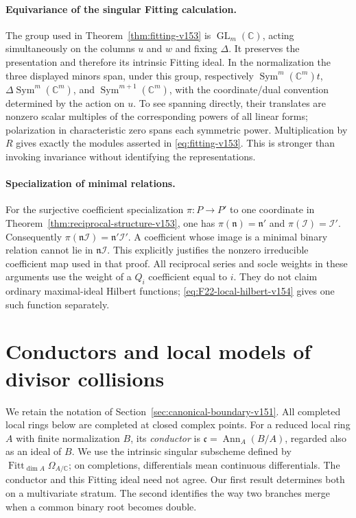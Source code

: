 \documentclass[11pt,reqno]{amsart}
\numberwithin{equation}{section}
\theoremstyle{definition}\newtheorem{definition}[theorem]{Definition}
\theoremstyle{remark}\newtheorem{remark}[theorem]{Remark}
\newcommand{\C}{\mathbb C}\newcommand{\Q}{\mathbb Q}
\DeclareMathOperator{\Sym}{Sym}\DeclareMathOperator{\Gr}{Gr}
\DeclareMathOperator{\Fitt}{Fitt}\DeclareMathOperator{\Ann}{Ann}
\begin{document}
\paragraph{Equivariance of the singular Fitting calculation.}
The group used in Theorem~\ref{thm:fitting-v153} is
$\operatorname{GL}_m(\C)$, acting simultaneously on the columns
$u$ and $w$ and fixing $\Delta$. It preserves the presentation and
therefore its intrinsic Fitting ideal. In the normalization the
three displayed minors span, under this group, respectively
$\Sym^m(\C^m)t$, $\Delta\Sym^m(\C^m)$, and
$\Sym^{m+1}(\C^m)$, with the coordinate/dual convention determined
by the action on $u$. To see spanning directly, their translates
are nonzero scalar multiples of the corresponding powers of all
linear forms; polarization in characteristic zero spans each
symmetric power. Multiplication by $R$ gives exactly the modules
asserted in \eqref{eq:fitting-v153}. This is stronger than invoking
invariance without identifying the representations.

\paragraph{Specialization of minimal relations.}
For the surjective coefficient specialization $\pi:P\to P'$ to
one coordinate in Theorem~\ref{thm:reciprocal-structure-v153}, one
has $\pi(\mathfrak n)=\mathfrak n'$ and
$\pi(\mathcal I)=\mathcal I'$. Consequently
$\pi(\mathfrak n\mathcal I)=\mathfrak n'\mathcal I'$.
A coefficient whose image is a minimal binary relation cannot lie
in $\mathfrak n\mathcal I$. This explicitly justifies the nonzero
irreducible coefficient map used in that proof. All reciprocal
series and socle weights in these arguments use the weight of a
$Q_i$ coefficient equal to $i$. They do not claim ordinary
maximal-ideal Hilbert functions; \eqref{eq:F22-local-hilbert-v154}
gives one such function separately.


\section{Conductors and local models of divisor collisions}
\label{sec:conductor-v152}

We retain the notation of Section~\ref{sec:canonical-boundary-v151}.
All completed local rings below are completed at closed complex points.
For a reduced local ring $A$ with finite normalization $B$, its
\emph{conductor} is $\mathfrak c=\Ann_A(B/A)$, regarded also as an
ideal of $B$.  We use the intrinsic singular subscheme defined by
$\Fitt_{\dim A}\Omega_{A/\C}$; on completions, differentials mean
continuous differentials.  The conductor and this Fitting ideal need
not agree.  Our first result determines both on a multivariate
stratum.  The second identifies the way two branches merge when a
common binary root becomes double.
\end{document}
